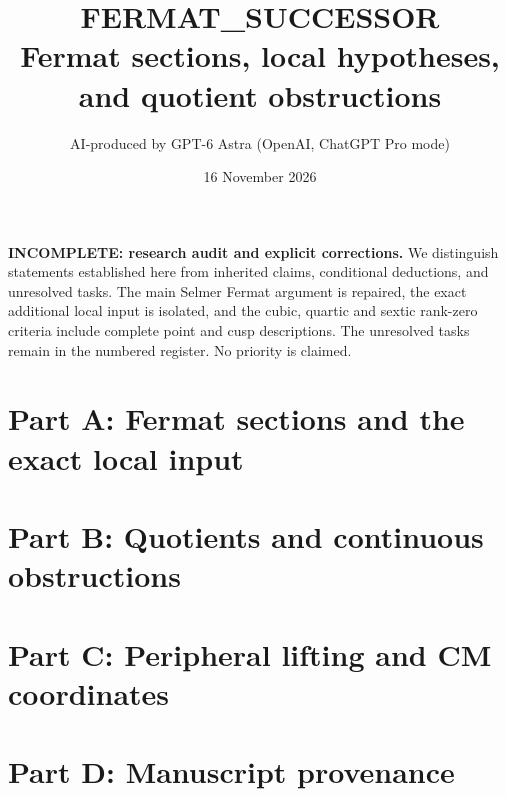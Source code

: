 \documentclass[11pt,a4paper]{article}
\title{FERMAT\_SUCCESSOR\\Fermat sections, local hypotheses, and quotient obstructions}
\author{AI-produced by GPT-6 Astra (OpenAI, ChatGPT Pro mode)}
\date{16 November 2026}
\begin{document}
\maketitle
\noindent\textbf{INCOMPLETE: research audit and explicit corrections.} We distinguish statements established here from inherited claims, conditional deductions, and unresolved tasks. The main Selmer Fermat argument is repaired, the exact additional local input is isolated, and the cubic, quartic and sextic rank-zero criteria include complete point and cusp descriptions. The unresolved tasks remain in the numbered register. No priority is claimed.
\tableofcontents
\section{Part A: Fermat sections and the exact local input}














\section{Part B: Quotients and continuous obstructions}











\section{Part C: Peripheral lifting and CM coordinates}


\section{Part D: Manuscript provenance}



\end{document}

